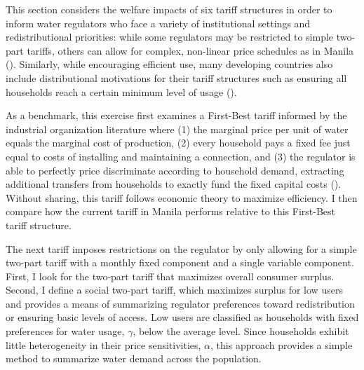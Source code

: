 \documentclass[12pt]{article}
\begin{document}
This section considers the welfare impacts of six tariff structures in order to inform water regulators who face a variety of institutional settings and redistributional priorities: while some regulators may be restricted to simple two-part tariffs, others can allow for complex, non-linear price schedules as in Manila (\cite{hoque2013state}).  Similarly, while encouraging efficient use, many developing countries also include distributional motivations for their tariff structures such as ensuring all households reach a certain minimum level of usage (\cite{szabo2015value}).

As a benchmark, this exercise first examines a First-Best tariff informed by the industrial organization literature where (1) the marginal price per unit of water equals the marginal cost of production, (2) every household pays a fixed fee just equal to costs of installing and maintaining a connection, and (3) the regulator is able to perfectly price discriminate according to household demand, extracting additional transfers from households to exactly fund the fixed capital costs (\cite{auerbach1978two,oi1971disneyland}).  Without sharing, this tariff follows economic theory to maximize efficiency.  I then compare how the current tariff in Manila performs relative to this First-Best tariff structure.

The next tariff imposes restrictions on the regulator by only allowing for a simple two-part tariff with a monthly fixed component and a single variable component.  First, I look for the two-part tariff that maximizes overall consumer surplus.  Second, I define a social two-part tariff, which maximizes surplus for low users and provides a means of summarizing regulator preferences toward redistribution or ensuring basic levels of access.  Low users are classified as households with fixed preferences for water usage, $\gamma$, below the average level.  Since households exhibit little heterogeneity in their price sensitivities, $\alpha$, this approach provides a simple method to summarize water demand across the population.  
\end{document}
